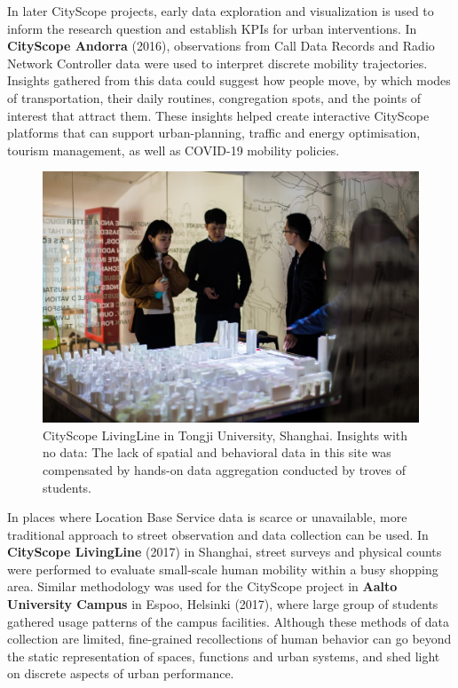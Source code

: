 {In later CityScope projects, early data exploration and visualization is used to inform the research question and establish KPIs for urban interventions. In \textbf{CityScope Andorra} (2016), observations from Call Data Records and Radio Network Controller data were used to interpret discrete mobility trajectories. Insights gathered from this data could suggest how people move, by which modes of transportation, their daily routines, congregation spots, and the points of interest that attract them. These insights helped create interactive CityScope platforms that can support urban-planning, traffic and energy optimisation, tourism management, as well as COVID-19 mobility policies.}

\begin{figure}
\begin{center}
    \includegraphics[width=\textwidth]{figures/CSL_tongji.jpg}
\end{center}
   \caption{CityScope LivingLine in Tongji University, Shanghai. Insights with no data: The lack of spatial and behavioral data in this site was compensated by hands-on data aggregation conducted by troves of students.}
\label{fig:CSL_tongji}
\end{figure}

{In places where Location Base Service data is scarce or unavailable, more traditional approach to street observation and data collection can be used. In \textbf{CityScope LivingLine} (2017) in Shanghai, street surveys and physical counts were performed to evaluate small-scale human mobility within a busy shopping area. Similar methodology was  used for the CityScope project in \textbf{Aalto University Campus} in Espoo, Helsinki (2017), where large group of students gathered usage patterns of the campus facilities. Although these methods of data collection are limited, fine-grained recollections of human behavior can go beyond the static representation of spaces, functions and urban systems, and shed light on discrete aspects of urban performance.}

